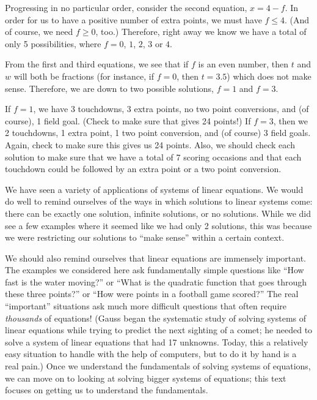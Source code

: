 {Progressing in no particular order, consider the second equation, $x = 4-f$. In order for us to have a positive number of extra points, we must have $f\leq 4$. (And of course, we need $f\geq 0$, too.) Therefore, right away we know we have a total of only 5 possibilities, where $f = 0$, $1$, $2$, $3$ or $4$.

From the first and third equations, we see that if $f$ is an even number, then $t$ and $w$ will both be fractions (for instance, if $f=0$, then $t = 3.5$) which does not make sense. Therefore, we are down to two possible solutions, $f = 1$ and $f=3$. 



If $f=1$, we have 3 touchdowns, 3 extra points, no two point conversions, and (of course), 1 field goal. (Check to make sure that gives 24 points!) If $f=3$, then we 2 touchdowns, 1 extra point, 1 two point conversion, and (of course) 3 field goals. Again, check to make sure this gives us 24 points. Also, we should check each solution to make sure that we have a total of 7 scoring occasions and that each touchdown could be followed by an extra point or a two point conversion.}

\medskip

We have seen a variety of applications of systems of linear equations. We would do well to remind ourselves of the ways in which solutions to linear systems come: there can be exactly one solution, infinite solutions, or no solutions. While we did see a few examples where it seemed like we had only 2 solutions, this was because we were restricting our solutions to ``make sense'' within a certain context. 

We should also remind ourselves that linear equations are immensely important. The examples we considered here ask fundamentally simple questions like ``How fast is the water moving?'' or ``What is the quadratic function that goes through these three points?'' or ``How were points in a football game scored?'' The real ``important'' situations ask much more difficult questions that often require \textit{thousands} of equations! (Gauss began the systematic study of solving systems of linear equations while trying to predict the next sighting of a comet; he needed to solve a system of linear equations that had 17 unknowns. Today, this a relatively easy situation to handle with the help of computers, but to do it by hand is a real pain.) Once we understand the fundamentals of solving systems of equations, we can move on to looking at solving bigger systems of equations; this text focuses on getting us to understand the fundamentals.\\

